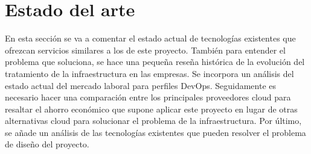 \chapter{Estado del arte}
	\begin{text}
		En esta sección se va a comentar el estado actual de tecnologías existentes que ofrezcan servicios similares a los de este proyecto. También para entender el problema que soluciona, se hace una pequeña reseña histórica de la evolución del tratamiento de la infraestructura en las empresas. Se incorpora un análisis del estado actual del mercado laboral para perfiles DevOps. Seguidamente es necesario hacer una comparación entre los principales proveedores cloud para resaltar el ahorro económico que supone aplicar este proyecto en lugar de otras alternativas cloud para solucionar el problema de la infraestructura. Por último, se añade un análisis de las tecnologías existentes que pueden resolver el problema de diseño del proyecto.
	\end{text}

